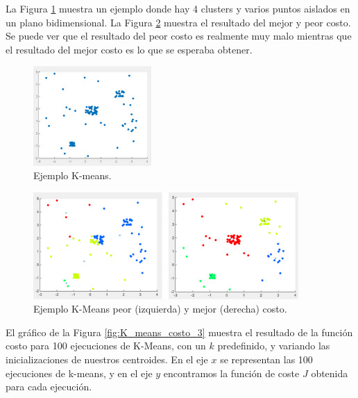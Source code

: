 \documentclass[12pt,a4paper]{article}
\begin{document}
\begin{sloppypar}
La Figura \ref{fig:K_means_costo_1} muestra un ejemplo donde hay 4 clusters y varios puntos aislados en un plano bidimensional. La Figura \ref{fig:K_means_costo_2} muestra el resultado del mejor y peor costo. Se puede ver que el resultado del peor costo es realmente muy malo mientras que el resultado del mejor costo es lo que se esperaba obtener.  

\begin{figure}[H]    %
 \centering
 \includegraphics[width=0.4\textwidth]{images/K_means_costo_1.png}
 \captionsetup{justification=centering,margin=2cm}
 \caption{Ejemplo K-means. \cite{apunte_uba}}
 \label{fig:K_means_costo_1}
\end{figure}

\begin{figure}[H]    %
 \centering
 \includegraphics[width=0.9\textwidth]{images/K_means_costo_2.png}
 \captionsetup{justification=centering,margin=1cm}
 \caption{Ejemplo K-Means peor (izquierda) y mejor (derecha) costo. \cite{apunte_uba}}
 \label{fig:K_means_costo_2}
\end{figure}  

El gráfico de la Figura \ref{fig:K_means_costo_3} muestra el resultado de la función costo para 100 ejecuciones de K-Means, con un $k$ predefinido, y variando las inicializaciones de nuestros centroides. En el eje $x$ se representan las 100 ejecuciones de k-means, y en el eje $y$ encontramos la función de coste $J$ obtenida para cada ejecución. 


\end{sloppypar}
\end{document}
